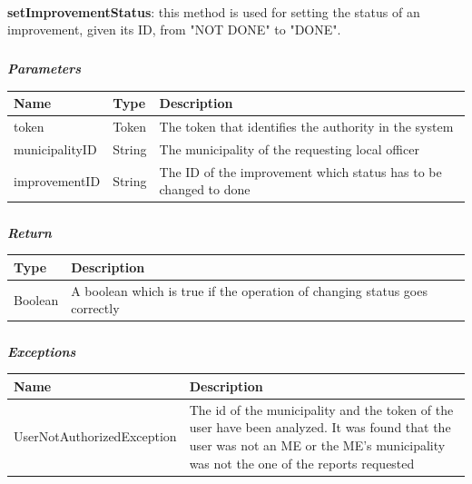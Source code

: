 					\paragraph{}
							\textbf{setImprovementStatus}: this method is used for setting the status of an improvement, given its ID, from "NOT DONE" to "DONE".
							\subparagraph{}
							\vspace{-3mm}
							\textit{\textbf{Parameters}}
							\vspace{-2mm}
								\begin{table}[!h]
									\begin{tabular}{L{0.2\textwidth}L{0.15\textwidth}L{0.45\textwidth}}
										\toprule
										\textbf{Name} & \textbf{Type} & \textbf{Description} \\
										\midrule
								  		token & Token & The token that identifies the authority in the system \\
								  		municipalityID & String & The municipality of the requesting local officer \\
								  		improvementID & String & The ID of the improvement which status has to be changed to done \\
								 		\bottomrule
									\end{tabular}
								\end{table}
							\subparagraph{}
							\vspace{-3mm}
								\textit{\textbf{Return}}
								\vspace{-2mm}
									\begin{table}[!h]
									\begin{tabular}{L{0.2\textwidth}L{0.6\textwidth}}
										\toprule
										\textbf{Type} & \textbf{Description} \\
										\midrule
								  		Boolean & A boolean which is true if the operation of changing status goes correctly \\
								 		\bottomrule
									\end{tabular}
								\end{table}
							\subparagraph{}
							\vspace{-6mm}
								\textit{\textbf{Exceptions}}
								\vspace{-2mm}
									\begin{table}[!h]
									\begin{tabular}{L{0.4\textwidth}L{0.4\textwidth}}
										\toprule
										Name & Description \\
										\midrule
								  	UserNotAuthorizedException & The id of the municipality and the token of the user have been analyzed. It was found that the user was not an ME or the ME's municipality was not the one of the reports requested \\
								 		\bottomrule
									\end{tabular}
								\end{table}
					
